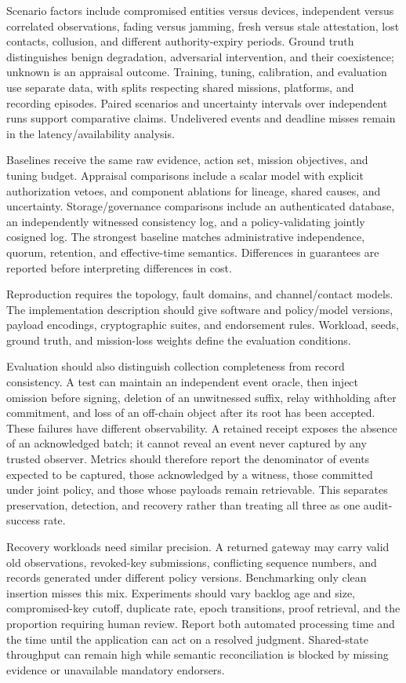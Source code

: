 \documentclass[blockchains,review,accept,moreauthors]{Definitions/mdpi}
\begin{document}
Scenario factors include compromised entities versus devices, independent versus correlated observations, fading versus jamming, fresh versus stale attestation, lost contacts, collusion, and different authority-expiry periods. Ground truth distinguishes benign degradation, adversarial intervention, and their coexistence; unknown is an appraisal outcome. Training, tuning, calibration, and evaluation use separate data, with splits respecting shared missions, platforms, and recording episodes. Paired scenarios and uncertainty intervals over independent runs support comparative claims. Undelivered events and deadline misses remain in the latency/availability analysis.

Baselines receive the same raw evidence, action set, mission objectives, and tuning budget. Appraisal comparisons include a scalar model with explicit authorization vetoes, and component ablations for lineage, shared causes, and uncertainty. Storage/governance comparisons include an authenticated database, an independently witnessed consistency log, and a policy-validating jointly cosigned log. The strongest baseline matches administrative independence, quorum, retention, and effective-time semantics. Differences in guarantees are reported before interpreting differences in cost.

Reproduction requires the topology, fault domains, and channel/contact models. The implementation description should give software and policy/model versions, payload encodings, cryptographic suites, and endorsement rules. Workload, seeds, ground truth, and mission-loss weights define the evaluation conditions.

Evaluation should also distinguish collection completeness from record consistency. A test can maintain an independent event oracle, then inject omission before signing, deletion of an unwitnessed suffix, relay withholding after commitment, and loss of an off-chain object after its root has been accepted. These failures have different observability. A retained receipt exposes the absence of an acknowledged batch; it cannot reveal an event never captured by any trusted observer. Metrics should therefore report the denominator of events expected to be captured, those acknowledged by a witness, those committed under joint policy, and those whose payloads remain retrievable. This separates preservation, detection, and recovery rather than treating all three as one audit-success rate.

Recovery workloads need similar precision. A returned gateway may carry valid old observations, revoked-key submissions, conflicting sequence numbers, and records generated under different policy versions. Benchmarking only clean insertion misses this mix. Experiments should vary backlog age and size, compromised-key cutoff, duplicate rate, epoch transitions, proof retrieval, and the proportion requiring human review. Report both automated processing time and the time until the application can act on a resolved judgment. Shared-state throughput can remain high while semantic reconciliation is blocked by missing evidence or unavailable mandatory endorsers.
\end{document}
